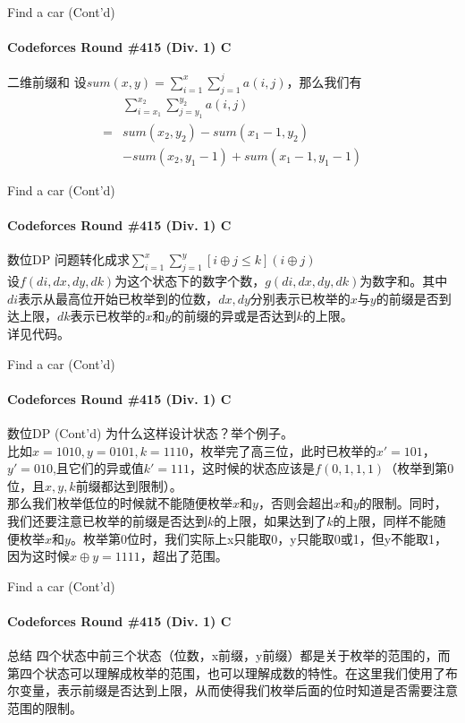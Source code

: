 \documentclass[hyperref={unicode=true}]{beamer}
\theoremstyle{definition}
\theoremstyle{proof}
\begin{document}
\begin{frame}{Find a car (Cont'd)}\framesubtitle{Codeforces Round \#415 (Div. 1) C}
  \begin{block}{二维前缀和}
    设$sum(x,y)=\sum_{i=1}^x \sum_{j=1}^j a(i,j)$，那么我们有
    \begin{align}
      &\sum_{i=x_1}^{x_2} \sum_{j=y_1}^{y_2} a(i,j)\\
      =&sum(x_2,y_2)-sum(x_1-1,y_2)\\
      &-sum(x_2,y_1-1)+sum(x_1-1,y_1-1)
      \end{align}
  \end{block}
\end{frame}

\begin{frame}{Find a car (Cont'd)}\framesubtitle{Codeforces Round \#415 (Div. 1) C}
  \begin{exampleblock}{数位DP}
    问题转化成求$\sum_{i=1}^{x}\sum_{j=1}^{y}[i\oplus j\leq k](i \oplus j)$\\
    设$f(di,dx,dy,dk)$为这个状态下的数字个数，$g(di,dx,dy,dk)$为数字和。其中$di$表示从最高位开始已枚举到的位数，$dx,dy$分别表示已枚举的$x$与$y$的前缀是否到达上限，$dk$表示已枚举的$x$和$y$的前缀的异或是否达到$k$的上限。\\
    详见代码。
  \end{exampleblock}
\end{frame}

\begin{frame}{Find a car (Cont'd)}\framesubtitle{Codeforces Round \#415 (Div. 1) C}
  \begin{exampleblock}{数位DP (Cont'd)}
    为什么这样设计状态？举个例子。\\
    比如$x=1010,y=0101,k=1110$，枚举完了高三位，此时已枚举的$x'=101$，$y'=010$,且它们的异或值$k'=111$，这时候的状态应该是$f(0,1,1,1)$（枚举到第0位，且$x,y,k$前缀都达到限制）。\\
    那么我们枚举低位的时候就不能随便枚举$x$和$y$，否则会超出$x$和$y$的限制。同时，我们还要注意已枚举的前缀是否达到$k$的上限，如果达到了$k$的上限，同样不能随便枚举$x$和$y$。枚举第0位时，我们实际上x只能取0，y只能取0或1，但y不能取1，因为这时候$x\oplus y=1111$，超出了范围。
  \end{exampleblock}
\end{frame}

\begin{frame}{Find a car (Cont'd)}\framesubtitle{Codeforces Round \#415 (Div. 1) C}
  \begin{exampleblock}{总结}
    四个状态中前三个状态（位数，x前缀，y前缀）都是关于枚举的范围的，而第四个状态可以理解成枚举的范围，也可以理解成数的特性。在这里我们使用了布尔变量，表示前缀是否达到上限，从而使得我们枚举后面的位时知道是否需要注意范围的限制。
  \end{exampleblock}
\end{frame}
\end{document}
